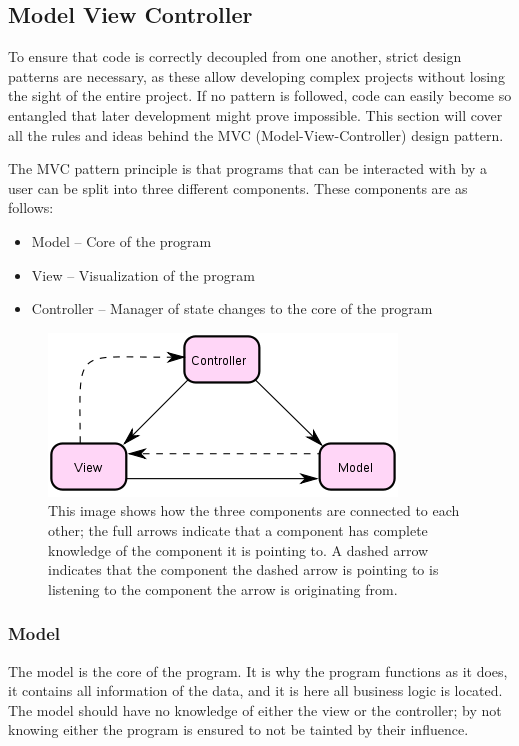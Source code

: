 
\subsection{Model View Controller}

To ensure that code is correctly decoupled from one another, strict
design patterns are necessary, as these allow developing complex projects
without losing the sight of the entire project. If no pattern is followed,
code can easily become so entangled that later development might prove
impossible. This section will cover all the rules and ideas behind
the MVC (Model-View-Controller) design pattern.

The MVC pattern principle is that programs that can be interacted
with by a user can be split into three different components. These
components are as follows:
\begin{itemize}
\item Model -- Core of the program
\item View -- Visualization of the program
\item Controller -- Manager of state changes to the core of the program
\end{itemize}
\begin{figure}
\centering{}\includegraphics{MVC}\caption{\label{fig:MVCBasic}This image shows how the three components are
connected to each other; the full arrows indicate that a component
has complete knowledge of the component it is pointing to. A dashed
arrow indicates that the component the dashed arrow is pointing to
is listening to the component the arrow is originating from. }
\end{figure}



\subsubsection{Model}

The model is the core of the program. It is why the program functions
as it does, it contains all information of the data, and it is here
all business logic is located. The model should have no knowledge
of either the view or the controller; by not knowing either the program
is ensured to not be tainted by their influence.

